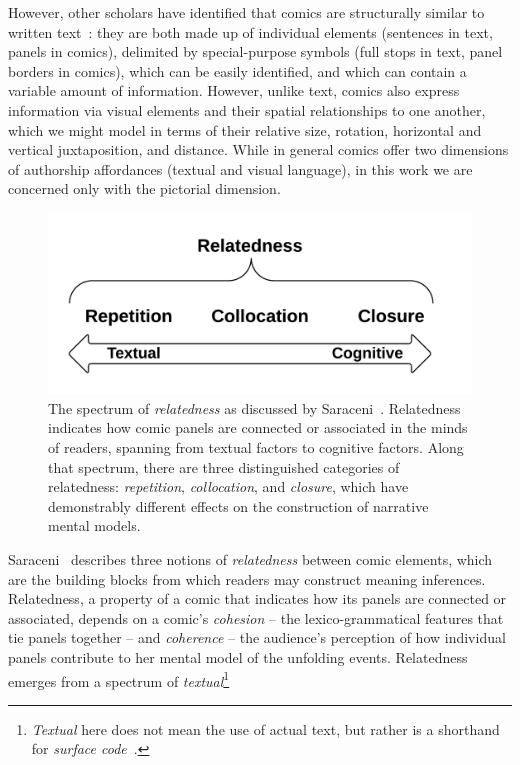 However, other scholars have identified that comics are structurally similar to written
text~\cite{saraceni2016relatedness}: they are both made up of individual
elements (sentences in text, panels in comics), delimited by special-purpose
symbols (full stops in text, panel borders in comics), which can be easily
identified, and which can contain a variable amount of information. However,
unlike text, comics also express information via visual elements and their spatial
relationships to one another, which we might model in terms of their
relative size, rotation, horizontal and vertical juxtaposition, and
distance. While in general comics offer two dimensions of authorship
affordances (textual and visual language), in this work we are concerned
only with the pictorial dimension.
%
\begin{figure}
	\centering
	\includegraphics[width=0.75\columnwidth]{relatedness.png}
	\caption{
		The spectrum of \emph{relatedness} as discussed by
                Saraceni~\cite{saraceni2016relatedness}. Relatedness indicates how 
		comic panels are connected or associated in the minds of 
		readers, spanning from textual factors to cognitive factors. 
		Along that spectrum, there are three  distinguished 
		categories of relatedness: \emph{repetition}, 
		\emph{collocation}, and \emph{closure}, which have
		demonstrably different effects on the construction of
		narrative mental models.
		}
	\label{figure:relatedness}
\end{figure}
%
Saraceni~\cite{saraceni2016relatedness} describes three notions of
\emph{relatedness} between comic elements, which are the building blocks
from which readers may construct meaning inferences.
Relatedness, a property of a comic that indicates how its panels are
connected or associated, depends on a comic's \emph{cohesion} -- the
lexico-grammatical features that tie panels together -- and \emph{coherence} --
the audience's perception of how individual panels contribute to her mental model
of the unfolding events. Relatedness emerges from a spectrum of \emph{textual}\footnote{\emph{Textual} here does not mean the use of actual text, but rather is a shorthand for \emph{surface code}~\cite{zwaan1998situation}.}
